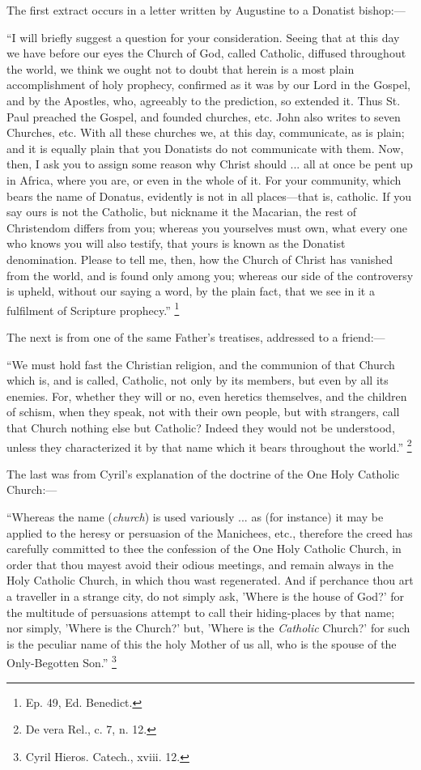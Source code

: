 The first extract occurs in a letter written by
Augustine to a Donatist bishop:—

``I will
briefly suggest a question for your consideration. Seeing that at this
day we have before our eyes the Church of God, called Catholic,
diffused throughout the world, we think we ought not to doubt that
herein is a most plain accomplishment of holy prophecy, confirmed as
it was by our Lord in the Gospel, and by the Apostles, who, agreeably
to the prediction, so extended it. Thus St. Paul preached the Gospel,
and founded churches, etc. John also writes to seven Churches, etc.
With all these churches we, at this day, communicate, as is plain; and
it is equally plain that you Donatists do not communicate with them.
Now, then, I ask you to assign some reason why Christ should ... all
at once be pent up in Africa, where you are, or even in the whole of
it. For your community, which bears the name of Donatus, evidently is
not in all places—that is, catholic. If you say ours is not the
Catholic, but nickname it the Macarian, the rest of Christendom
differs from you; whereas you yourselves must own, what every one who
knows you will also testify, that yours is known as the Donatist
denomination. Please to tell me, then, how the Church of Christ has
vanished from the world, and is found only among you; whereas our side
of the controversy is upheld, without our saying a word, by the plain
fact, that we see in it a fulfilment of Scripture prophecy.''
\footnote{Ep. 49, Ed. Benedict.}

The next is from one of the same Father's
treatises, addressed to a friend:—

``We
must hold fast the Christian religion, and the communion of that
Church which is, and is called, Catholic, not only by its members, but
even by all its enemies. For, whether they will or no, even heretics
themselves, and the children of schism, when they speak, not with
their own people, but with strangers, call that Church nothing else
but Catholic? Indeed they would not be understood, unless they
characterized it by that name which it bears throughout the world.''
\footnote{De vera Rel., c. 7, n. 12.}

The last was from Cyril's explanation of the
doctrine of the One Holy Catholic Church:—

``Whereas
the name (\emph{church}) is used variously ... as (for instance) it
may be applied to the heresy or persuasion of the Manichees, etc.,
therefore the creed has carefully committed to thee the confession of
the One Holy Catholic Church, in order that thou mayest avoid their
odious meetings, and remain always in the Holy Catholic Church, in
which thou wast regenerated. And if perchance thou art a traveller in
a strange city, do not simply ask, 'Where is the house of God?' for
the multitude of persuasions attempt to call their hiding-places by
that name; nor simply, 'Where is the Church?' but, 'Where is the \emph{Catholic}
Church?' for such is the peculiar name of this the holy Mother of us
all, who is the spouse of the Only-Begotten Son.''
\footnote{Cyril
Hieros. Catech., xviii. 12.}

